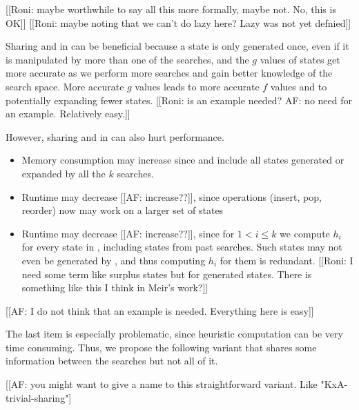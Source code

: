 [[Roni: maybe worthwhile to say all this more formally, maybe not. No, this is OK]]
[[Roni: maybe noting that we can't do lazy here? Lazy was not yet defnied]]

Sharing \open and \closed in \kxastar can be beneficial because a state is only generated once, even if it is manipulated by more than one of the \astar searches, and the $g$ values of states get more accurate as we perform more searches and gain better knowledge of the search space.
More accurate $g$ values leads to more accurate $f$ values and to potentially expanding fewer states. [[Roni: is an example needed? AF: no need for an example. Relatively easy.]]

However, sharing \open and \closed in \kxastar can also hurt performance.
\begin{itemize}
\item Memory consumption may increase since \open and \closed include all states generated or expanded by all the $k$ \astar searches.
\item Runtime may decrease [[AF: increase??]], since \open operations (insert, pop, reorder) now may work on a larger set of states
\item Runtime may decrease  [[AF: increase??]], since for $1<i\leq k$ we compute $h_i$ for every state in \open, including states from past searches.
Such states may not even be generated by , and thus computing $h_i$ for them is redundant.
[[Roni: I need some term like surplus states but for generated states. There is something like this I think in Meir's work?]]
\end{itemize}

[[AF: I do not think that an example is needed. Everything here is easy]]

The last item is especially problematic, since heuristic computation can be very time consuming.
Thus, we propose the following \kxastar variant that shares some information between the searches but not all of it.

[[AF: you might want to give a name to this straightforward variant. Like "KxA-trivial-sharing"]















